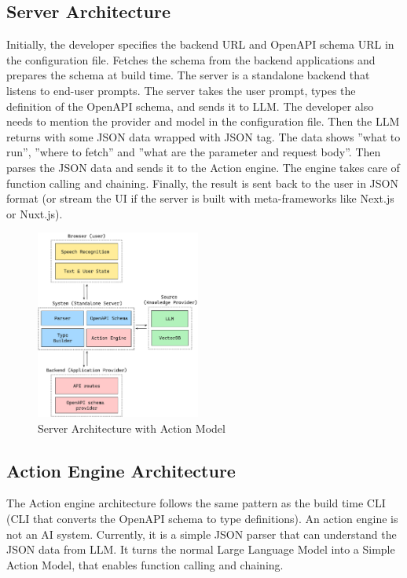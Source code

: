 \documentclass[conference]{IEEEtran}
\begin{document}
\subsection{Server Architecture}
Initially, the developer specifies the backend URL and OpenAPI schema URL in the configuration file. Fetches the schema from the backend applications and prepares the schema at build time. The server is a standalone backend that listens to end-user prompts. The server takes the user prompt, types the definition of the OpenAPI schema, and sends it to LLM. The developer also needs to mention the provider and model in the configuration file. Then the LLM returns with some JSON data wrapped with JSON tag. The data shows ”what to run”, ”where to fetch” and ”what are the parameter and request body”. Then parses the JSON data and sends it to the Action engine. The engine takes care of function calling and chaining. Finally, the result is sent back to the user in JSON format (or stream the UI if the server is built with meta-frameworks like Next.js or Nuxt.js).

\begin{figure}[htbp]
    \centering
    \includegraphics[width=0.48\textwidth]{images/server.png}
    \caption{Server Architecture with Action Model}
    \label{fig}
\end{figure}


\subsection{Action Engine Architecture}
The Action engine architecture follows the same pattern as the build time CLI (CLI that converts the OpenAPI schema to type definitions). An action engine is not an AI system. Currently, it is a simple JSON parser that can understand the JSON data from LLM. It turns the normal Large Language Model into a Simple Action Model, that enables function calling and chaining. 
\end{document}
